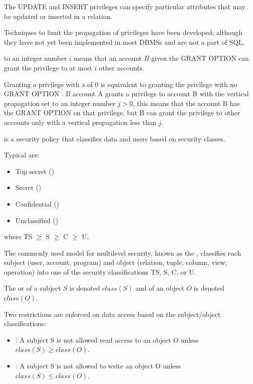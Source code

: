     \par The UPDATE and INSERT privileges can specify particular attributes that may be updated or inserted in a relation.

    \par Techniques to limit the propagation of privileges have been developed, although they have not yet been implemented in most DBMSs and are not a part of SQL.
    \par {} to an integer number $i$ means that an account $B$
given the GRANT OPTION can grant the privilege to at most $i$ other accounts.
    \par Granting a privilege with a  of 0 is equivalent to granting the privilege with no GRANT OPTION . If account A grants a privilege to account B with the vertical propagation set to an integer number $j > 0$, this means that the account B has the GRANT OPTION on that privilege, but B can grant the privilege to other accounts only with a vertical propagation less than $j$.

  
  \par {} is a security policy that classifies data and users based on security classes.
  \par Typical  are:
  \begin{itemize}
    \item Top secret ()
    \item Secret ()
    \item Confidential ()
    \item Unclassified ()
  \end{itemize}
  where TS $\geq$ S $\geq$ C $\geq$ U.
  \par The commonly used model for multilevel security, known as the , classifies each subject (user, account, program) and object (relation, tuple, column, view, operation) into one of the security classifications TS, S, C, or U.
  \par The  or  of a subject $S$ is denoted $class(S)$ and of an object $O$ is denoted $class(O)$.
  \par Two restrictions are enforced on data access based on the subject/object classifications:
  \begin{itemize}
    \item {}: A subject S is not allowed read access to an object O unless $class(S) \geq class(O)$.
    \item {}: A subject S is not allowed to write an object O unless $class(S) \leq class(O)$.
  \end{itemize}

